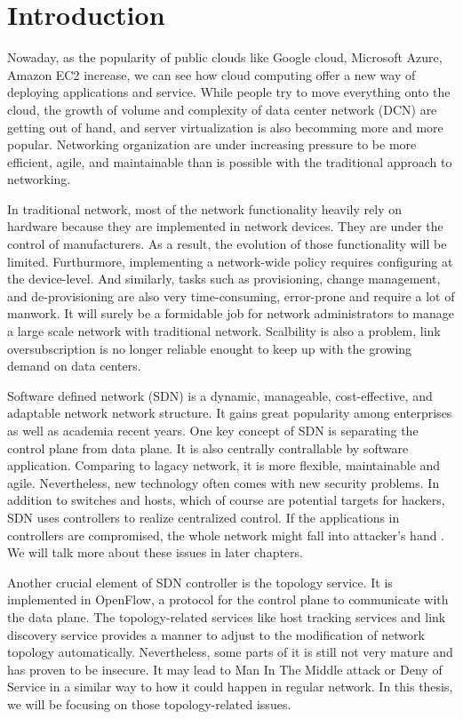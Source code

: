 \chapter{Introduction}
\label{chap:intro}
\setcounter{page}{1}

Nowaday, as the popularity of public clouds like Google cloud, Microsoft Azure, Amazon EC2 increase, we can see how cloud computing offer a new way of deploying applications and service. While people try to move everything onto the cloud, the growth of volume and complexity of data center network (DCN) are getting out of hand, and server virtualization is also becomming more and more popular. Networking organization are under increasing pressure to be more efficient, agile, and maintainable than is possible with the traditional approach to networking.

In traditional network, most of the network functionality heavily rely on hardware because they are implemented in network devices. They are under the control of manufacturers. As a result, the evolution of those functionality will be limited. Furthurmore, implementing a network-wide policy requires configuring at the device-level. And similarly, tasks such as provisioning, change management, and de-provisioning are also very time-consuming, error-prone and require a lot of manwork. It will surely be a formidable job for network administrators to manage a large scale network with traditional network. Scalbility is also a problem, link oversubscription is no longer reliable enought to keep up with the growing demand on data centers\cite{TTN}.

Software defined network (SDN) is a dynamic, manageable, cost-effective, and adaptable network network structure. It gains great popularity among enterprises as well as academia recent years. One key concept of SDN is separating the control plane from data plane. It is also centrally contrallable by software application. Comparing to lagacy network, it is more flexible, maintainable and agile. Nevertheless, new technology often comes with new security problems. In addition to switches and hosts, which of course are potential targets for hackers, SDN uses controllers to realize centralized control. If the applications in controllers are compromised, the whole network might fall into attacker's hand \cite{TSA}. We will talk more about these issues in later chapters.

Another crucial element of SDN controller is the topology service. It is implemented in OpenFlow, a protocol for the control plane to communicate with the data plane. The topology-related services like host tracking services and link discovery service provides a manner to adjust to the modification of network topology automatically. Nevertheless, some parts of it is still not very mature and has proven to be insecure\cite{AOT}. It may lead to Man In The Middle attack or Deny of Service in a similar way to how it could happen in regular network\cite{ASO}. In this thesis, we will be focusing on those topology-related issues.

